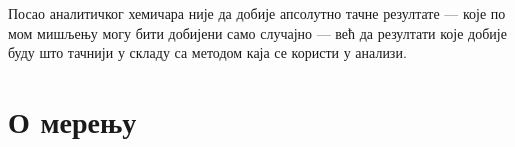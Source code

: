 \begin{savequote}
    Посао аналитичког хемичара није да добије апсолутно
    тачне резултате --- које по мом мишљењу могу бити
    добијени само случајно --- већ да резултати које
    добије буду што тачнији у складу са методом каја се
    користи у анализи.
\end{savequote}
\chapter{О мерењу}
